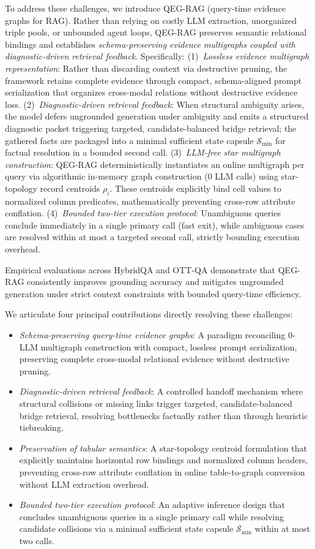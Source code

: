 \documentclass[runningheads]{llncs}
\begin{document}
To address these challenges, we introduce QEG-RAG (query-time evidence graphs for RAG). Rather than relying on costly LLM extraction, unorganized triple pools, or unbounded agent loops, QEG-RAG preserves semantic relational bindings and establishes \emph{schema-preserving evidence multigraphs coupled with diagnostic-driven retrieval feedback}. Specifically:
(1)~\emph{Lossless evidence multigraph representation}: Rather than discarding context via destructive pruning, the framework retains complete evidence through compact, schema-aligned prompt serialization that organizes cross-modal relations without destructive evidence loss.
(2)~\emph{Diagnostic-driven retrieval feedback}: When structural ambiguity arises, the model defers ungrounded generation under ambiguity and emits a structured diagnostic packet triggering targeted, candidate-balanced bridge retrieval; the gathered facts are packaged into a minimal sufficient state capsule $\mathcal{S}_{\min}$ for factual resolution in a bounded second call.
(3)~\emph{LLM-free star multigraph construction}: QEG-RAG deterministically instantiates an online multigraph per query via algorithmic in-memory graph construction (0 LLM calls) using star-topology record centroids $\rho_i$. These centroids explicitly bind cell values to normalized column predicates, mathematically preventing cross-row attribute conflation.
(4)~\emph{Bounded two-tier execution protocol}: Unambiguous queries conclude immediately in a single primary call (fast exit), while ambiguous cases are resolved within at most a targeted second call, strictly bounding execution overhead.

Empirical evaluations across HybridQA and OTT-QA demonstrate that QEG-RAG consistently improves grounding accuracy and mitigates ungrounded generation under strict context constraints with bounded query-time efficiency.

We articulate four principal contributions directly resolving these challenges:
\begin{itemize}
    \item \emph{Schema-preserving query-time evidence graphs}: A paradigm reconciling 0-LLM multigraph construction with compact, lossless prompt serialization, preserving complete cross-modal relational evidence without destructive pruning.
    \item \emph{Diagnostic-driven retrieval feedback}: A controlled handoff mechanism where structural collisions or missing links trigger targeted, candidate-balanced bridge retrieval, resolving bottlenecks factually rather than through heuristic tiebreaking.
    \item \emph{Preservation of tabular semantics}: A star-topology centroid formulation that explicitly maintains horizontal row bindings and normalized column headers, preventing cross-row attribute conflation in online table-to-graph conversion without LLM extraction overhead.
    \item \emph{Bounded two-tier execution protocol}: An adaptive inference design that concludes unambiguous queries in a single primary call while resolving candidate collisions via a minimal sufficient state capsule $\mathcal{S}_{\min}$ within at most two calls.
\end{itemize}
\end{document}
